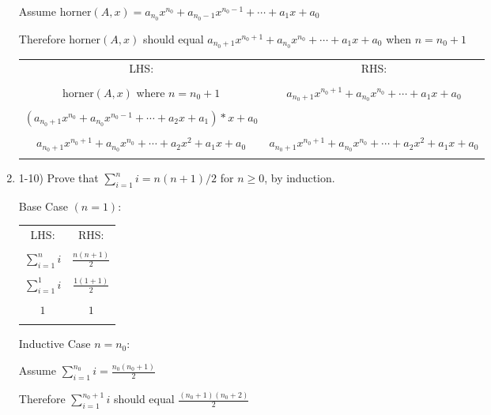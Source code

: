 \documentclass{article}
\begin{document}
\begin{enumerate}
        Assume horner$(A, x) = a_{n_0}x^{n_0} + a_{n_0-1}x^{n_0-1} + \cdots + a_1x + a_0 $

        Therefore horner$(A, x)$ should equal $ a_{n_0+1}x^{n_0+1} + a_{n_0}x^{n_0} + \cdots + a_1x + a_0 $ when $n = n_0 + 1$

    \begin{center}
        \begin{tabular}{ c | c } 
        LHS: & RHS: \\ \\
        horner$(A, x)$ where $n = n_0 + 1$ & $ a_{n_0+1}x^{n_0+1} + a_{n_0}x^{n_0} + \cdots + a_1x + a_0 $ \\ \\
        $ (a_{n_0+1}x^{n_0} + a_{n_0}x^{n_0 - 1} + \cdots + a_2x + a_1)*x+a_0 $ & \\ \\
        $ \boxed{a_{n_0+1}x^{n_0 + 1} + a_{n_0}x^{n_0} + \cdots + a_2x^2 + a_1x + a_0} $  & $\boxed{a_{n_0+1}x^{n_0 + 1} + a_{n_0}x^{n_0} + \cdots + a_2x^2 + a_1x + a_0}$ \\ \\
        \end{tabular}
    \end{center}
    
    \item 1-10) Prove that $\sum_{i=1}^{n}i=n(n+1)/2 $ for $n \ge 0 $, by induction.
    
    Base Case $(n = 1)$:
    \begin{center}
        \begin{tabular}{ c | c } 
        LHS: & RHS: \\ & \\
        $ \sum_{i=1}^{n} i $ & $ \frac{n(n+1)}{2}$ \\ \\
        $ \sum_{i=1}^{1} i $ & $ \frac{1(1+1)}{2}$ \\ \\
        $ 1 $ & $ 1 $ \\ \\
        \end{tabular}
    \end{center}
    Inductive Case $ n = n_0 $:
    
        Assume $ \sum_{i=1}^{n_0} i = \frac{n_0(n_0+1)}{2} $

        Therefore $ \sum_{i=1}^{n_0+1} i $ should equal $ \frac{(n_0+1)(n_0+2)}{2} $


\end{enumerate}
\end{document}
